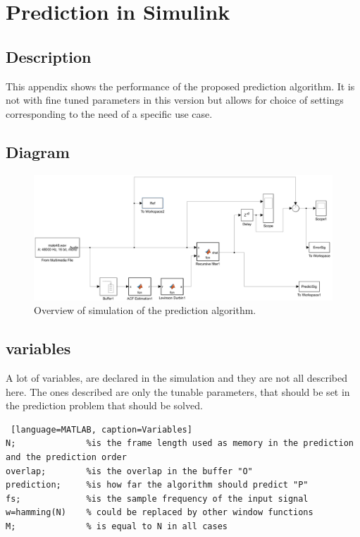 
\section{Prediction in Simulink} \label{sec:predicSimulink}


\subsection{Description}
This appendix shows the performance of the proposed prediction algorithm. It is not with fine tuned parameters in this version but allows for choice of settings corresponding to the need of a specific use case.  


\subsection{Diagram}
\begin{figure} [h]
	\centering
	\includegraphics[width=\textwidth]{../Journal/Code/SimulinkPrediction}
	\caption{Overview of simulation of the prediction algorithm.}
	\label{Fig:PredictionSimulink}
\end{figure}


\subsection{variables}
A lot of variables, are declared in the simulation and they are not all described here. The ones described are only the tunable parameters, that should be set in the prediction problem that should be solved. 
\begin{lstlisting} [language=MATLAB, caption=Variables]
N; 				%is the frame length used as memory in the prediction and the prediction order
overlap;		%is the overlap in the buffer "O"
prediction; 	%is how far the algorithm should predict "P"
fs; 			%is the sample frequency of the input signal 
w=hamming(N)	% could be replaced by other window functions
M;				% is equal to N in all cases
\end{lstlisting}

